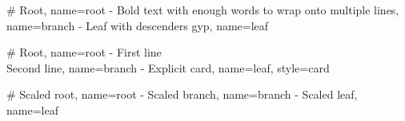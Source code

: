 \documentclass{article}
\def\expectedScale{1}
\begin{document}
\begin{mindchart}[style=boxed,shape=rect,max_width=3cm,align=left]
# Root, name=root
  - Bold text with enough words to wrap onto multiple lines, name=branch
    - Leaf with descenders gyp, name=leaf
\end{mindchart}
\par\medskip
\begin{mindchart}[style=classic,shape=card,align=center]
# Root, name=root
  - First line\\Second line, name=branch
    - Explicit card, name=leaf, style=card
\end{mindchart}
\par\medskip
\def\expectedScale{0.7}
\begin{mindchart}[style=boxed,shape=rect,scale=0.7]
# Scaled root, name=root
  - Scaled branch, name=branch
    - Scaled leaf, name=leaf
\end{mindchart}
\par\medskip
\end{document}
